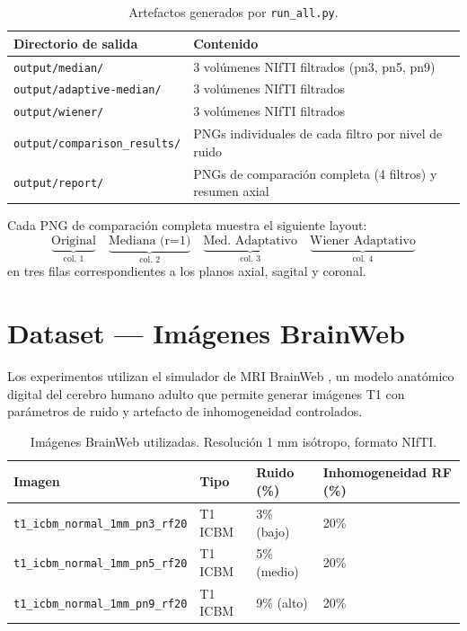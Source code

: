 \documentclass[12pt, a4paper]{article}
\begin{document}
\begin{table}[H]
\centering
\renewcommand{\arraystretch}{1.3}
\begin{tabularx}{\textwidth}{lX}
\toprule
\textbf{Directorio de salida} & \textbf{Contenido} \\
\midrule
\texttt{output/median/} & 3 volúmenes NIfTI filtrados (pn3, pn5, pn9) \\
\texttt{output/adaptive-median/} & 3 volúmenes NIfTI filtrados \\
\texttt{output/wiener/} & 3 volúmenes NIfTI filtrados \\
\texttt{output/comparison\_results/} & PNGs individuales de cada filtro por nivel de ruido \\
\texttt{output/report/} & PNGs de comparación completa (4 filtros) y resumen axial \\
\bottomrule
\end{tabularx}
\caption{Artefactos generados por \texttt{run\_all.py}.}
\label{tab:outputs}
\end{table}

Cada PNG de comparación completa muestra el siguiente layout:
\[
  \underbrace{\text{Original}}_{\text{col. 1}} \quad
  \underbrace{\text{Mediana (r=1)}}_{\text{col. 2}} \quad
  \underbrace{\text{Med. Adaptativo}}_{\text{col. 3}} \quad
  \underbrace{\text{Wiener Adaptativo}}_{\text{col. 4}}
\]
en tres filas correspondientes a los planos axial, sagital y coronal.

\section{Dataset — Imágenes BrainWeb}

Los experimentos utilizan el simulador de MRI BrainWeb \cite{brainweb}, un modelo
anatómico digital del cerebro humano adulto que permite generar imágenes T1 con
parámetros de ruido y artefacto de inhomogeneidad controlados.

\begin{table}[H]
\centering
\renewcommand{\arraystretch}{1.3}
\begin{tabular}{llll}
\toprule
\textbf{Imagen} & \textbf{Tipo} & \textbf{Ruido (\%)} & \textbf{Inhomogeneidad RF (\%)} \\
\midrule
\texttt{t1\_icbm\_normal\_1mm\_pn3\_rf20} & T1 ICBM & 3\% (bajo)  & 20\% \\
\texttt{t1\_icbm\_normal\_1mm\_pn5\_rf20} & T1 ICBM & 5\% (medio) & 20\% \\
\texttt{t1\_icbm\_normal\_1mm\_pn9\_rf20} & T1 ICBM & 9\% (alto)  & 20\% \\
\bottomrule
\end{tabular}
\caption{Imágenes BrainWeb utilizadas. Resolución 1 mm isótropo, formato NIfTI.}
\end{table}
\end{document}
